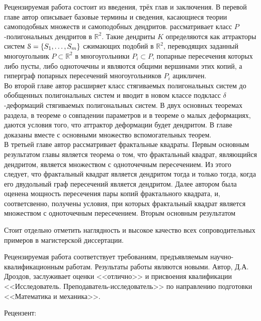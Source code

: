 \documentclass[oneside, 14pt, a4paper]{extreport}
\begin{document}
Рецензируемая работа состоит из введения, трёх глав и заключения.
В перевой главе автор описывает базовые термины и сведения, касающиеся теории самоподобных множеств и самоподобных дендритов. 
 рассматривает класс  $P$-полигональных дендритов в  $\mathbb R^2$. 
Такие дендриты $K$ определяются как аттракторы  систем $\EuScript S = \{S_1, \ldots, S_m\}$  сжимающих подобий в $\mathbb R^2$, переводящих заданный многоугольник $P\subset \mathbb R^2 $ в многоугольники $P_i\subset P$, попарные пересечения которых либо пусты, либо одноточечны и являются общими вершинами этих копий, а гиперграф попарных пересечений многоугольников $P_i$ ацикличен.\\ 

Во второй главе автор расширяет класс стягиваемых полигональных систем до обобщенных полигональных систем и вводит в новом классе подкласс $\delta$-деформаций стягиваемых полигональных систем. 
В двух основных теоремах раздела, в теореме о совпадении параметров и в теореме о малых деформациях, даются условия того, что аттрактор деформации будет дендритом. 
В главе доказаны вместе с основными множество вспомогательных теорем. \\

В третьей главе автор рассматривает фрактальные квадраты.
Первым основным результатом главы является теорема о том, что фрактальный квадрат, являющийся дендритом, является множеством с одноточечным пересечением.
Из этого следует, что фрактальный квадрат является дендритом тогда и только тогда, когда его двудольный граф пересечений является дендритом.
Далее автором была оценена мощность пересечения пары копий фрактального квадрата, и, соответсвенно, получены условия, при которых фрактальный квадрат является множеством с одноточечным пересечением.
Вторым основным результатом 


Стоит отдельно отметить наглядность и высокое качество всех сопроводительных примеров в магистерской диссертации.



Рецензируемая работа соответствует требованиям, предъявляемым научно-квалификационным работам. 
Результаты работы являются новыми. 
Автор, Д.А. Дроздов, заслуживает оценки <<отлично>> и присвоения квалификации <<Исследователь. Преподаватель-исследователь>> по направлению подготовки <<Математика и механика>>.

\vspace{2cm}

Рецензент:\\
\end{document}
